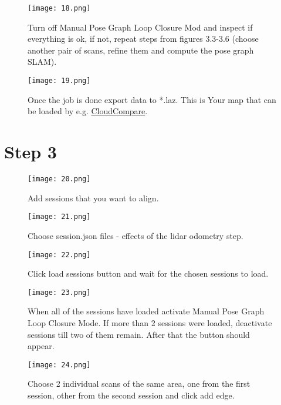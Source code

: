 \begin{figure}[H]
	\centering
	\texttt{[image: 18.png]}
	\caption{Turn off Manual Pose Graph Loop Closure Mod and inspect if everything is ok, if not,  repeat steps from figures 3.3-3.6 (choose another pair of scans, refine them and compute the pose graph SLAM).}
	\label{fig:18}
\end{figure}

\begin{figure}[H]
	\centering
	\texttt{[image: 19.png]}
	\caption{Once the job is done export data to *.laz. This is Your map that can be loaded by e.g. \href{https://www.cloudcompare.org/}{CloudCompare}.}
	\label{fig:19}
\end{figure}

\section{Step 3}
\begin{figure}[H]
	\centering
	\texttt{[image: 20.png]}
	\caption{Add sessions that you want to align.}
	\label{fig:20}
\end{figure}

\begin{figure}[H]
	\centering
	\texttt{[image: 21.png]}
	\caption{Choose session.json files - effects of the lidar odometry step.}
	\label{fig:21}
\end{figure}

\begin{figure}[H]
	\centering
	\texttt{[image: 22.png]}
	\caption{Click load sessions button and wait for the chosen sessions to load.}
	\label{fig:22}
\end{figure}

\begin{figure}[H]
	\centering
	\texttt{[image: 23.png]}
	\caption{When all of the sessions have loaded activate Manual Pose Graph Loop Closure Mode. If more than 2 sessions were loaded, deactivate sessions till two of them remain. After that the button should appear.}
	\label{fig:23}
\end{figure}

\begin{figure}[H]
	\centering
	\texttt{[image: 24.png]}
	\caption{Choose 2 individual scans of the same area, one from the first session, other from the second session and click add edge.}
	\label{fig:24}
\end{figure}

